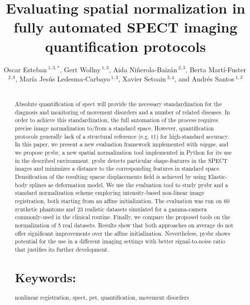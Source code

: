 \documentclass{frontiers}
\def\firstAuthorLast{Esteban {et~al}} %
\def\Authors{Oscar Esteban\,$^{1,3,*}$, 
             Gert Wollny\,$^{1,3}$, 
             Aida Ni\~nerola-Baiz\'an\,$^{2,3}$, 
             Berta Mart\'i-Fuster\,$^{2,3}$,
             Mar\'ia Jes\'us Ledesma-Carbayo\,$^{1,3}$, 
             Xavier Setoain\,$^{3,4}$, and 
             Andr\'es Santos\,$^{1,3}$}
\begin{document}
\onecolumn
{}

\title[Evaluating normalization]%
  {Evaluating spatial normalization in fully automated SPECT imaging quantification protocols}

\author[\firstAuthorLast ]{\Authors}
\address{}
\correspondance{}
\editor{}

\maketitle




\begin{abstract}
\section{}
Absolute quantification of \gls*{spect} will
  provide the necessary standardization for the diagnosis and monitoring
  of movement disorders and a number of related diseases.
In order to achieve this standardization, the full automation of the
  process requires precise image normalization to/from a standard space.
However, quantification protocols generally lack of a structural reference
  (e.g. \acrlong{t1}) for high-standard accuracy.
In this paper, we present a new evaluation framework implemented with \emph{nipype},
  and we propose \gls*{pysbr}, a new spatial normalization tool implemented in Python for 
  its use in the described environment.
\gls*{pysbr} detects particular shape-features in the SPECT images and
  minimizes a distance to the corresponding features in standard space.
Densification of the resulting sparse displacements field is achieved by using
  Elastic-body splines as deformation model.
We use the evaluation tool to study \gls*{pysbr} and a standard normalization
  scheme employing intensity-based non-linear image registration, both starting 
  from an affine initialization. 
The evaluation was run on 60 synthetic  phantoms and 23 realistic datasets simulated 
  for a gamma-camera commonly-used in the clinical routine.
Finally, we compare the proposed tools on the normalization of 5 real datasets.
Results show that both approaches on average do not offer significant improvements over 
  the affine initialization.
Nevertheless, \gls*{pysbr} shows potential for the use in a different
  imaging settings with better signal-to-noise ratio that justifies its further development.


\tiny
  \section{Keywords:} nonlinear registration, spect, pet, quantification, movement disorders
\end{abstract}
\end{document}
